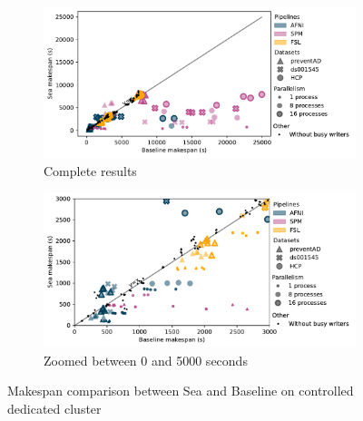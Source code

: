 \begin{figure}

\begin{subfigure}{\textwidth}
    \centering
    \captionsetup{width=.85\linewidth}
    \includegraphics[width=\columnwidth]{figures/sea-neuro/slashbin_nozoom.pdf}%
    \caption{Complete results}\label{fig:seaneuro:slashbinfull}
\end{subfigure}
\begin{subfigure}{\textwidth}
    \centering
    \captionsetup{width=.85\linewidth}
    \includegraphics[width=\linewidth]{figures/sea-neuro/slashbin_withzoom.pdf}
    \caption{Zoomed between 0 and 5000 seconds}\label{fig:seaneuro:slashbinzoom}
\end{subfigure}
\caption{Makespan comparison between Sea and Baseline on controlled dedicated cluster}
\label{fig:seaneuro:slashbin}
\end{figure}

